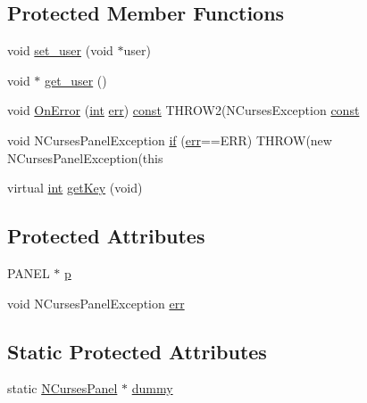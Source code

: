 \subsection*{Protected Member Functions}
\begin{DoxyCompactItemize}
\item 
void \hyperlink{class_n_curses_panel_acef688ed0e170b994108cf4e30903f27}{set\-\_\-user} (void $\ast$user)
\item 
void $\ast$ \hyperlink{class_n_curses_panel_a4a7a5dc519377b57fabee39a10ad7aff}{get\-\_\-user} ()
\item 
void \hyperlink{class_n_curses_panel_a7377a6976fcc6dd2033e7155f5c09a9c}{On\-Error} (\hyperlink{term__entry_8h_ad65b480f8c8270356b45a9890f6499ae}{int} \hyperlink{class_n_curses_panel_a36889096b2df7770196fa535c6333068}{err}) \hyperlink{term__entry_8h_a57bd63ce7f9a353488880e3de6692d5a}{const} T\-H\-R\-O\-W2(N\-Curses\-Exception \hyperlink{term__entry_8h_a57bd63ce7f9a353488880e3de6692d5a}{const} 
\item 
void N\-Curses\-Panel\-Exception \hyperlink{class_n_curses_panel_ae6d79debeb1ed6187d1023cc7adc83ec}{if} (\hyperlink{class_n_curses_panel_a36889096b2df7770196fa535c6333068}{err}==E\-R\-R) T\-H\-R\-O\-W(new N\-Curses\-Panel\-Exception(this
\item 
virtual \hyperlink{term__entry_8h_ad65b480f8c8270356b45a9890f6499ae}{int} \hyperlink{class_n_curses_panel_a9dd1bd03740014f9f80e935b605b11ff}{get\-Key} (void)
\end{DoxyCompactItemize}
\subsection*{Protected Attributes}
\begin{DoxyCompactItemize}
\item 
P\-A\-N\-E\-L $\ast$ \hyperlink{class_n_curses_panel_a222da97e5dca710840d6a10fbb9dfc90}{p}
\item 
void N\-Curses\-Panel\-Exception \hyperlink{class_n_curses_panel_a36889096b2df7770196fa535c6333068}{err}
\end{DoxyCompactItemize}
\subsection*{Static Protected Attributes}
\begin{DoxyCompactItemize}
\item 
static \hyperlink{class_n_curses_panel}{N\-Curses\-Panel} $\ast$ \hyperlink{class_n_curses_panel_a905442933927c1a758274e5d17dd65cb}{dummy}
\end{DoxyCompactItemize}


